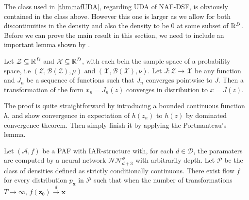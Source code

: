 The class used in \cref{thm:nafUDA}, regarding UDA of NAF-DSF, is obviously contained in the class above. However this one
is larger as we allow for both discontinuities in the density and also the density to be 0 at some subset of \(\mathbb{R}^D\).
Before we can prove the main result in this section, we need to include an important lemma shown by \cite{naf}.
\begin{lemma}\label{lemma:huang_conv}
    Let \(\mathcal{Z} \subseteq \mathbb{R}^D\) and \(\mathcal{X} \subseteq \mathbb{R}^D\), with each bein the sample space of a probability space,
    i.e \((\mathcal{Z}, \mathscr{B}(\mathcal{Z}), \mu)\) and \((\mathcal{X}, \mathscr{B}(\mathcal{X}), \nu)\). Let 
    \(J\colon \mathcal{Z} \to \mathcal{X}\) be any function and \(J_n\) be a sequence of functions such that \(J_n\) converges
    pointwise to \(J\). Then a transformation of the form \(x_n = J_n(z)\) converges in distribution to \(x = J(z)\).
\end{lemma}
The proof is quite straightforward by introducing a bounded continuous function \(h\), and show convergence in expectation of
\(h(z_n)\) to \(h(z)\) by dominated convergence theorem. Then simply finish it by applying the Portmanteau's lemma. 
\begin{theorem}\label{thm:paf_uda_multi}
    Let \((\mathcal{A}, f)\) be a PAF with IAR-structure with, for each \(d \in \mathcal{D}\), the paramaters are
    computed by a neural network \(\mathcal{NN}_{d+3}^{\phi}\) with arbitrarily depth. Let \(\mathscr{P}\) be the class of densities defined
    as strictly conditionally continuous. There exist flow \(f\) for every distribution \(p_{\bm x}\) in \(\mathscr{P}\) such 
    that when the number of transformations \(T\to \infty\), \(f(\bm z_0) \xrightarrow{d} \bm x\) 
\end{theorem}
